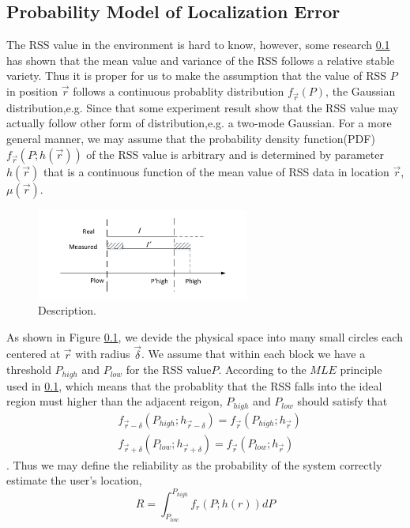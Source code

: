 \documentclass[10pt,conference,compsocconf,letterpaper]{IEEEtran}
\begin{document}
\subsection{Probability Model of Localization Error}
The RSS value in the environment is hard to know, however, some research \ref{} has shown that the mean value and variance of the RSS follows a relative stable variety. Thus it is proper for us to make the assumption that the value of RSS $P$ in position $\vec r$ follows a continuous probablity distribution $f_{\vec r}(P)$, the Gaussian distribution,e.g. Since that some experiment result show that the RSS value may actually follow other form of distribution,e.g. a two-mode Gaussian. For a more general manner, we may assume that the probability density function(PDF)$f_{\vec r}(P;h(\vec r))$ of the RSS value is arbitrary and is determined by parameter $h(\vec r)$ that is a continuous function of the mean value of RSS data in location $\vec r$, $\mu(\vec r)$. 
\begin{figure}[!htbp]
\centering
\includegraphics [width = 7cm]{Figure2.pdf}
\caption{Description.}
\label{fig:4}
\end{figure}
As shown in Figure \ref{},  we devide the physical space into many small circles each centered at $\vec r$ with radius $\vec \delta$. We assume that within each block we have a threshold  $P_{high}$ and $P_{low}$ for the RSS value$P$.  According to the $MLE$ principle used in \ref{}, which means that the probablity that the RSS falls into the ideal region must higher than the adjacent reigon, $P_{high}$ and $P_{low}$ should satisfy that 
\begin{equation}
\begin{aligned}
&f_{\vec r-\delta}(P_{high};h_{\vec r-\delta})=f_{\vec r}(P_{high};h_{\vec r})\\
&f_{\vec r+\delta}(P_{low};h_{\vec r+\delta})=f_{\vec r}(P_{low};h_{\vec r}) 
\end{aligned}
\end{equation}
. Thus we may define the reliability as the probability of the system correctly estimate the user's location,  
\begin{equation}
R = \int_{{P_{low}}}^{{P_{high}}} {{f_r}(P;h(r))dP }
\end{equation}
\end{document}
